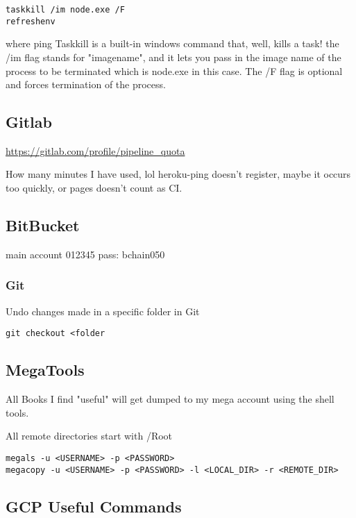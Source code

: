 \begin{verbatim}
taskkill /im node.exe /F
refreshenv
\end{verbatim}

where ping Taskkill is a built-in windows command that, well, kills a
task! the /im flag stands for "imagename", and it lets you pass in the
image name of the process to be terminated which is node.exe in this
case. The /F flag is optional and forces termination of the process.


\subsection{Gitlab}\label{gitlab}

\url{https://gitlab.com/profile/pipeline_quota}

How many minutes I have used, lol heroku-ping doesn't register, maybe it
occurs too quickly, or pages doesn't count as CI.

\subsection{BitBucket}\label{bitbucket}

main account 012345 pass: bchain050

\subsubsection{Git}\label{git}

Undo changes made in a specific folder in Git

\begin{verbatim}
git checkout <folder 
\end{verbatim}

\subsection{MegaTools}\label{megatools}

All Books I find "useful" will get dumped to my mega account using the
shell tools.

All remote directories start with /Root

\begin{verbatim}
megals -u <USERNAME> -p <PASSWORD>
megacopy -u <USERNAME> -p <PASSWORD> -l <LOCAL_DIR> -r <REMOTE_DIR>
\end{verbatim}

\subsection{GCP Useful Commands}\label{gcp-useful-commands}

